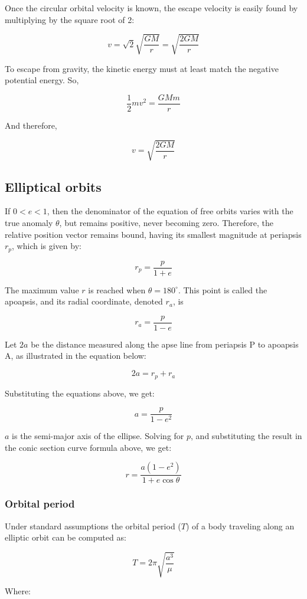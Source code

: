 \documentclass[12pt]{article}
\begin{document}
Once the circular orbital velocity is known, the escape velocity is easily
found by multiplying by the square root of 2:

\[v=\sqrt{2}\sqrt{\frac{GM}{r}}=\sqrt{\frac{2GM}{r}}\]

To escape from gravity, the kinetic energy must at least match the negative
potential energy. So,

\[\frac{1}{2}mv^{2}=\frac{GMm}{r}\]

And therefore,

\[v=\sqrt{\frac{2GM}{r}}\]

\subsection{Elliptical orbits}

If \(0<e<1\), then the denominator of the equation of free orbits varies with
the true anomaly \(\theta\), but remains positive, never becoming zero.
Therefore, the relative position vector remains bound, having its smallest
magnitude at periapsis \(r_{p}\), which is given by:

\[r_{p}=\frac{p}{1+e}\]

The maximum value \(r\) is reached when \(\theta=180^{\circ}\). This point is
called the apoapsis, and its radial coordinate, denoted \(r_{a}\), is

\[r_{a}=\frac{p}{1-e}\]

Let \(2a\) be the distance measured along the apse line from periapsis P to
apoapsis A, as illustrated in the equation below:

\[2a=r_p+r_a\]

Substituting the equations above, we get:

\[a=\frac{p}{1-e^2}\]

\(a\) is the semi-major axis of the ellipse. Solving for \(p\), and
substituting the result in the conic section curve formula above, we get:

\[r=\frac{a(1-e^2)}{1+e\cos\theta}\]

\subsubsection{Orbital period}

Under standard assumptions the orbital period (\(T\)) of a body traveling along
an elliptic orbit can be computed as:

\[T=2\pi\sqrt{\frac{a^3}{\mu}}\]

Where:
\end{document}
